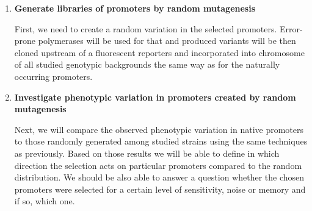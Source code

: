 \begin{enumerate}
	\begin{enumerate}
	
		\item \textbf{Generate libraries of promoters by random mutagenesis}
		
		First, we need to create a random variation in the selected promoters.
		Error-prone polymerases will be used for that and produced variants will be then cloned upstream of a fluorescent reporters and incorporated into chromosome of all studied genotypic backgrounds the same way as for the naturally occurring promoters.

		\item \textbf{Investigate phenotypic variation in promoters created by random mutagenesis}
		
		Next, we will compare the observed phenotypic variation in native promoters to those randomly generated among studied strains using the same techniques as previously.
		Based on those results we will be able to define in which direction the selection acts on particular promoters compared to the random distribution.
		We should be also able to answer a question whether the chosen promoters were selected for a certain level of sensitivity, noise or memory and if so, which one.

	
	\end{enumerate}

\end{enumerate}


\shorthandon{-} 
